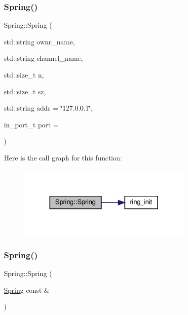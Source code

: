 \subsubsection{\texorpdfstring{Spring()}{Spring()}\hspace{0.1cm}{\footnotesize\ttfamily [1/3]}}
{\footnotesize\ttfamily Spring\+::\+Spring (\begin{DoxyParamCaption}\item[{std\+::string}]{ownr\+\_\+name,  }\item[{std\+::string}]{channel\+\_\+name,  }\item[{std\+::size\+\_\+t}]{n,  }\item[{std\+::size\+\_\+t}]{sz,  }\item[{std\+::string}]{addr = {\ttfamily \char`\"{}127.0.0.1\char`\"{}},  }\item[{in\+\_\+port\+\_\+t}]{port = {} }\end{DoxyParamCaption})}

Here is the call graph for this function\+:
\nopagebreak
\begin{figure}[H]
\begin{center}
\leavevmode
\includegraphics[width=244pt]{classSpring_abbbfe22a2b37ec7df976e7c2536541bf_cgraph}
\end{center}
\end{figure}
\mbox{\label{classSpring_a70cd0c870d6afdf75bb4fcaafdbcdf41}} 
\subsubsection{\texorpdfstring{Spring()}{Spring()}\hspace{0.1cm}{\footnotesize\ttfamily [2/3]}}
{\footnotesize\ttfamily Spring\+::\+Spring (\begin{DoxyParamCaption}\item[{\hyperlink{classSpring}{Spring} const \&}]{ }\end{DoxyParamCaption})\hspace{0.3cm}{\ttfamily [delete]}}

